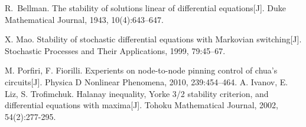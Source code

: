 \begin{thebibliography}{99}
R.~Bellman.
 The stability of solutions linear of differential equations[J].
 Duke Mathematical Journal, 1943, 10(4):643--647.

 X. Mao. Stability of stochastic differential equations with Markovian switching[J]. Stochastic Processes and Their
Applications, 1999, 79:45–67.

 M. Porfiri, F. Fiorilli. Experients on node-to-node pinning control of chua’s circuits[J]. Physica D Nonlinear Phenomena, 2010, 239:454–464.
A. Ivanov, E. Liz, S. Trofimchuk. Halanay inequality, Yorke 3/2 stability criterion, and differential equations with maxima[J]. Tohoku Mathematical Journal, 2002, 54(2):277-295.








\end{thebibliography}
